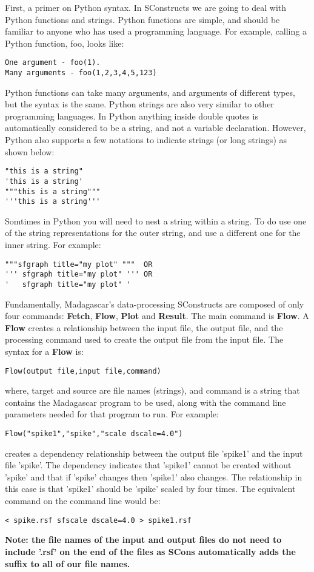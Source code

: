 First, a primer on Python syntax.  In SConstructs we are going to deal with Python functions and strings.  Python functions are simple, and should be familiar to anyone who has used a programming language.  For example, calling a Python function, foo, looks like:
\begin{verbatim}
One argument - foo(1).
Many arguments - foo(1,2,3,4,5,123)
\end{verbatim}
Python functions can take many arguments, and arguments of different types, but the syntax is the same.  Python strings are also very similar to other programming languages.  In Python anything inside double quotes is automatically considered to be a string, and not a variable declaration.  However, Python also supports a few  notations to indicate strings (or long strings) as shown below:
\begin{verbatim}
"this is a string"
'this is a string'
"""this is a string"""
'''this is a string'''
\end{verbatim}
Somtimes in Python you will need to nest a string within a string.  To do use one of the string representations for the outer string, and use a different one for the inner string.  For example:
\begin{verbatim}
"""sfgraph title="my plot" """  OR
''' sfgraph title="my plot" ''' OR
'   sfgraph title="my plot" ' 
\end{verbatim}

Fundamentally, Madagascar's data-processing SConstructs are composed of only four commands: \textbf{Fetch}, \textbf{Flow}, \textbf{Plot} and \textbf{Result}.  The main command is \textbf{Flow}.  A \textbf{Flow} creates a relationship between the input file, the output file, and the processing command used to create the output file from the input file.  The syntax for a \textbf{Flow} is:

\begin{verbatim}
Flow(output file,input file,command)
\end{verbatim}
where, target and source are file names (strings), and command is a string that contains the Madagascar program to be used, along with the command line parameters needed for that program to run.  For example:
\begin{verbatim}
Flow("spike1","spike","scale dscale=4.0")
\end{verbatim}
creates a dependency relationship between the output file 'spike1' and the input file 'spike'.  The dependency indicates that 'spike1' cannot be created without 'spike' and that if 'spike' changes then 'spike1' also changes.  The relationship in this case is that 'spike1' should be 'spike' scaled by four times.  The equivalent command on the command line would be: 
\begin{verbatim}
< spike.rsf sfscale dscale=4.0 > spike1.rsf
\end{verbatim}
\textbf{Note: the file names of the input and output files do not need to include '.rsf' on the end of the files as SCons automatically adds the suffix to all of our file names.}

